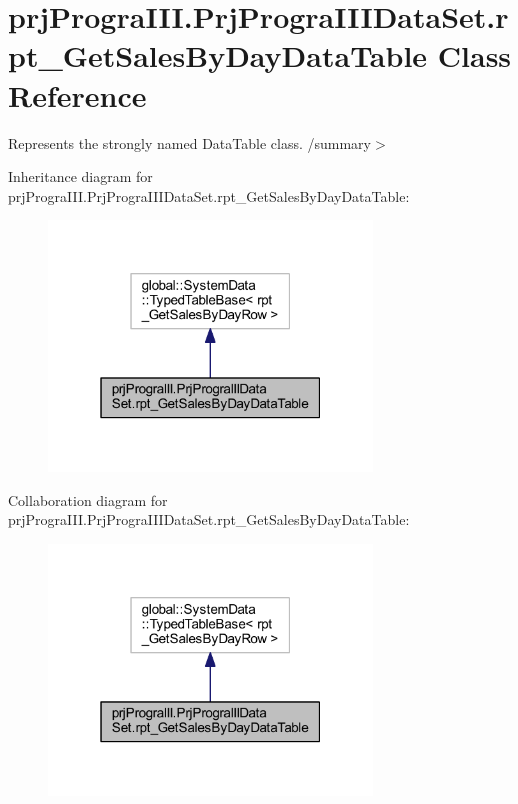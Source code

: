 \hypertarget{classprj_progra_i_i_i_1_1_prj_progra_i_i_i_data_set_1_1rpt___get_sales_by_day_data_table}{}\section{prj\+Progra\+I\+I\+I.\+Prj\+Progra\+I\+I\+I\+Data\+Set.\+rpt\+\_\+\+Get\+Sales\+By\+Day\+Data\+Table Class Reference}
\label{classprj_progra_i_i_i_1_1_prj_progra_i_i_i_data_set_1_1rpt___get_sales_by_day_data_table}


Represents the strongly named Data\+Table class. /summary$>$  




Inheritance diagram for prj\+Progra\+I\+I\+I.\+Prj\+Progra\+I\+I\+I\+Data\+Set.\+rpt\+\_\+\+Get\+Sales\+By\+Day\+Data\+Table\+:
\nopagebreak
\begin{figure}[H]
\begin{center}
\leavevmode
\includegraphics[width=244pt]{classprj_progra_i_i_i_1_1_prj_progra_i_i_i_data_set_1_1rpt___get_sales_by_day_data_table__inherit__graph}
\end{center}
\end{figure}


Collaboration diagram for prj\+Progra\+I\+I\+I.\+Prj\+Progra\+I\+I\+I\+Data\+Set.\+rpt\+\_\+\+Get\+Sales\+By\+Day\+Data\+Table\+:
\nopagebreak
\begin{figure}[H]
\begin{center}
\leavevmode
\includegraphics[width=244pt]{classprj_progra_i_i_i_1_1_prj_progra_i_i_i_data_set_1_1rpt___get_sales_by_day_data_table__coll__graph}
\end{center}
\end{figure}
